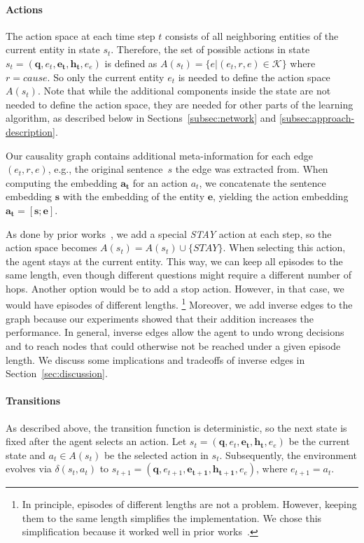 \paragraph{Actions} The action space at each time step $t$ consists of all neighboring entities of the current entity in state $s_t$. Therefore, the set of possible actions in state $s_t = (\mathbf{q}, e_t, \mathbf{e_t}, \mathbf{h_t}, e_e)$ is defined as $A(s_t) = \{e | (e_t, r, e) \in \mathcal{K}\}$ where $r = cause$. So only the current entity $e_t$ is needed to define the action space $A(s_t)$. Note that while the additional components inside the state are not needed to define the action space, they are needed for other parts of the learning algorithm, as described below in Sections~\ref{subsec:network} and \ref{subsec:approach-description}.

Our causality graph contains additional meta-information for each edge $(e_t, r, e)$, e.g., the original sentence~$s$ the edge was extracted from. When computing the embedding $\mathbf{a_t}$ for an action $a_t$, we concatenate the sentence embedding $\mathbf{s}$ with the embedding of the entity $\textbf{e}$, yielding the action embedding $\mathbf{a_t} = [\mathbf{s};\mathbf{e}]$. 

As done by prior works~\cite{Das2018Minerva, Lin2020RewardShaping, Qiu2020Stepwise}, we add a special \textit{STAY} action at each step, so the action space becomes $A(s_t) = A(s_t) \cup \{STAY\}$. When selecting this action, the agent stays at the current entity. This way, we can keep all episodes to the same length, even though different questions might require a different number of hops. Another option would be to add a stop action. However, in that case, we would have episodes of different lengths.%
\footnote{In principle, episodes of different lengths are not a problem. However, keeping them to the same length simplifies the implementation. We chose this simplification because it worked well in prior works~\cite{Das2018Minerva, Qiu2020Stepwise}.}
Moreover, we add inverse edges to the graph because our experiments showed that their addition increases the performance. In general, inverse edges allow the agent to undo wrong decisions and to reach nodes that could otherwise not be reached under a given episode length. We discuss some implications and tradeoffs of inverse edges in Section~\ref{sec:discussion}.

\paragraph{Transitions}
As described above, the transition function is deterministic, so the next state is fixed after the agent selects an action. Let $s_t=(\mathbf{q}, e_t, \mathbf{e_t}, \mathbf{h_t}, e_e)$ be the current state and $a_t \in A(s_t)$ be the selected action in $s_t$. Subsequently, the environment evolves via $\delta(s_t, a_t)$ to $s_{t+1}=(\mathbf{q}, e_{t+1}, \mathbf{e_{t+1}}, \mathbf{h_{t+1}}, e_e)$,
where $e_{t+1}=a_t$.

